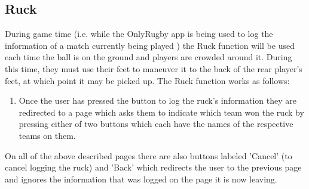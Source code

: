 \subsection{Ruck}
		During game time (i.e. while the OnlyRugby app is being used to log the information of a match currently being played ) the Ruck function will be used each time the ball is on the ground and players are crowded around it.
		During this time, they must use their feet to maneuver it to the back of the rear player's feet, at which point it may be picked up. The Ruck function works as follows:
		\begin{enumerate}
			\item Once the user has pressed the button to log the ruck's information they are redirected to a page which asks them to indicate which
			team won the ruck by pressing either of two buttons which each have the names of the respective teams on them.
		\end{enumerate}
	On all of the above described pages there are also buttons labeled 'Cancel' (to cancel logging the ruck) and 'Back' which redirects the user to the previous page and ignores the information that was logged on the page it is now leaving.